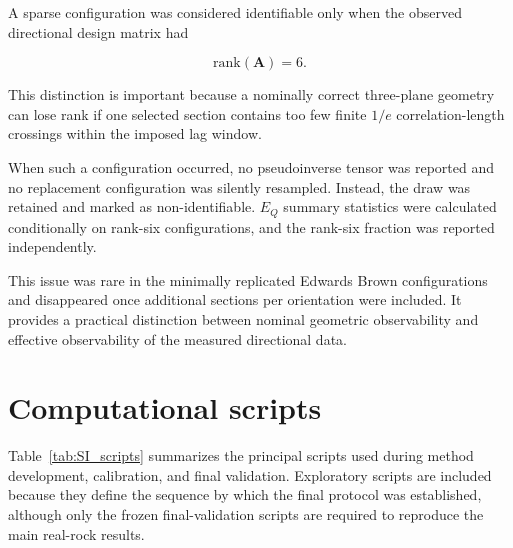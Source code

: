 \documentclass{article}
\begin{document}
A sparse configuration was considered identifiable only when the
observed directional design matrix had

\begin{equation}
    \mathrm{rank}(\mathbf{A})=6.
\end{equation}

This distinction is important because a nominally correct three-plane
geometry can lose rank if one selected section contains too few finite
$1/e$ correlation-length crossings within the imposed lag window.

When such a configuration occurred, no pseudoinverse tensor was
reported and no replacement configuration was silently resampled.
Instead, the draw was retained and marked as non-identifiable.
$E_Q$ summary statistics were calculated conditionally on rank-six
configurations, and the rank-six fraction was reported independently.

This issue was rare in the minimally replicated Edwards Brown
configurations and disappeared once additional sections per orientation
were included. It provides a practical distinction between nominal
geometric observability and effective observability of the measured
directional data.

\section{Computational scripts}
\label{sec:SI_scripts}

Table~\ref{tab:SI_scripts} summarizes the principal scripts used during
method development, calibration, and final validation. Exploratory
scripts are included because they define the sequence by which the final
protocol was established, although only the frozen final-validation
scripts are required to reproduce the main real-rock results.
\end{document}
